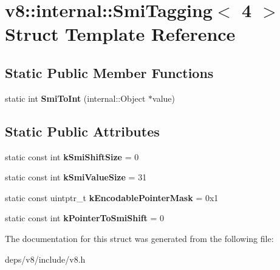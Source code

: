 \hypertarget{structv8_1_1internal_1_1_smi_tagging_3_014_01_4}{}\section{v8\+:\+:internal\+:\+:Smi\+Tagging$<$ 4 $>$ Struct Template Reference}
\label{structv8_1_1internal_1_1_smi_tagging_3_014_01_4}
\subsection*{Static Public Member Functions}
\begin{DoxyCompactItemize}
\item 
\hypertarget{structv8_1_1internal_1_1_smi_tagging_3_014_01_4_ae47c1d7f0359f4560b84fa8e573974e2}{}static int {\bfseries Smi\+To\+Int} (internal\+::\+Object $\ast$value)\label{structv8_1_1internal_1_1_smi_tagging_3_014_01_4_ae47c1d7f0359f4560b84fa8e573974e2}

\end{DoxyCompactItemize}
\subsection*{Static Public Attributes}
\begin{DoxyCompactItemize}
\item 
\hypertarget{structv8_1_1internal_1_1_smi_tagging_3_014_01_4_a4230f8d72054619f8141d0524733d8e9}{}static const int {\bfseries k\+Smi\+Shift\+Size} = 0\label{structv8_1_1internal_1_1_smi_tagging_3_014_01_4_a4230f8d72054619f8141d0524733d8e9}

\item 
\hypertarget{structv8_1_1internal_1_1_smi_tagging_3_014_01_4_a0857bbaab799b39a51f578744bf855f8}{}static const int {\bfseries k\+Smi\+Value\+Size} = 31\label{structv8_1_1internal_1_1_smi_tagging_3_014_01_4_a0857bbaab799b39a51f578744bf855f8}

\item 
\hypertarget{structv8_1_1internal_1_1_smi_tagging_3_014_01_4_a6847bed1398baca23b399c9b01121eaa}{}static const uintptr\+\_\+t {\bfseries k\+Encodable\+Pointer\+Mask} = 0x1\label{structv8_1_1internal_1_1_smi_tagging_3_014_01_4_a6847bed1398baca23b399c9b01121eaa}

\item 
\hypertarget{structv8_1_1internal_1_1_smi_tagging_3_014_01_4_a387b431afa5d17958107860f8b2f53b9}{}static const int {\bfseries k\+Pointer\+To\+Smi\+Shift} = 0\label{structv8_1_1internal_1_1_smi_tagging_3_014_01_4_a387b431afa5d17958107860f8b2f53b9}

\end{DoxyCompactItemize}


The documentation for this struct was generated from the following file\+:\begin{DoxyCompactItemize}
\item 
deps/v8/include/v8.\+h\end{DoxyCompactItemize}
